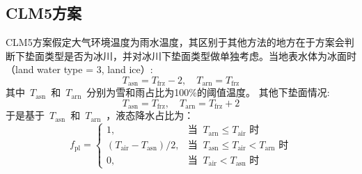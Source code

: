 \subsection{CLM5方案}
CLM5方案假定大气环境温度为雨水温度，其区别于其他方法的地方在于方案会判断下垫面类型是否为冰川，并对冰川下垫面类型做单独考虑。当地表水体为冰面时（land water type = 3, land ice）:
\begin{equation}
  T_{\mathrm{asn}} = T_{\mathrm{frz}} - 2,\quad T_{\mathrm{arn}} = T_{\mathrm{frz}}
\end{equation}
其中~$T_{\mathrm{asn}}$~和~$T_{\mathrm{arn}}$~分别为雪和雨占比为100\%的阈值温度。
其他下垫面情况:
\begin{equation}
  T_{\mathrm{asn}} = T_{\mathrm{frz}},\quad T_{\mathrm{arn}} = T_{\mathrm{frz}} +2
\end{equation}
于是基于~$T_{\mathrm{asn}}$~和~$T_{\mathrm{arn}}$~，液态降水占比为：
\begin{equation*}
  f_{\mathrm{pl}}= \begin{cases}
    1, & \text{当 }\ T_{\mathrm{arn}}\leqslant T_{\mathrm {air}} \text{ 时}\\
    (T_{\mathrm {air}} - T_{\mathrm{asn}})/2, & \text{当 }\  T_{\mathrm{asn}}\leqslant T_{\mathrm {air}} < T_{\mathrm{arn}} \text{ 时} \\
    0, & \text{当 }\ T_{\mathrm {air}} < T_{\mathrm{asn}} \text{ 时}
  \end{cases}
\end{equation*}


